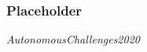 \documentclass[main]{subfiles}
\begin{document}

\subsubsection{Placeholder}
\textit{AutonomousChallenges2020}
\end{document}
